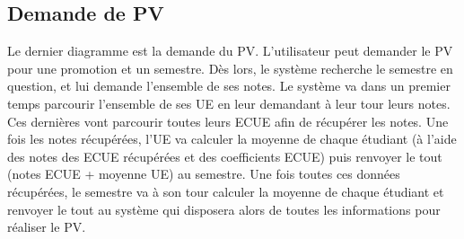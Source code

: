 \documentclass[letter, 11pt] {article}
\begin{document}
		\newpage
		
		\subsection{Demande de PV}
		
		Le dernier diagramme est la demande du PV. L’utilisateur peut demander le PV pour une promotion et un semestre. Dès lors, le système recherche le semestre en question, et lui demande l’ensemble de ses notes. Le système va dans un premier temps parcourir l’ensemble de ses UE en leur demandant à leur tour leurs notes. Ces dernières vont parcourir toutes leurs ECUE afin de récupérer les notes. Une fois les notes récupérées, l’UE va calculer la moyenne de chaque étudiant (à l’aide des notes des ECUE récupérées et des coefficients ECUE) puis renvoyer le tout (notes ECUE + moyenne UE) au semestre. Une fois toutes ces données récupérées, le semestre va à son tour calculer la moyenne de chaque étudiant et renvoyer le tout au système qui disposera alors de toutes les informations pour réaliser le PV.
		
\end{document}
